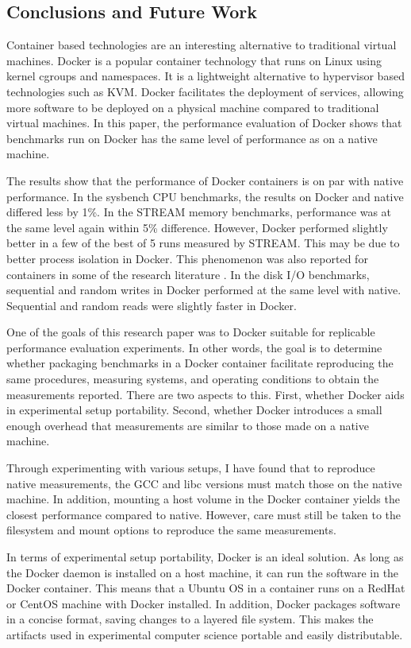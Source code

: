 \documentclass[11pt]{article}
\begin{document}
\begin{itemize}
\section{Conclusions and Future Work}

Container based technologies are an interesting alternative to traditional virtual machines. Docker is a popular container technology that runs on Linux using kernel cgroups and namespaces. It is a lightweight alternative to hypervisor based technologies such as KVM. Docker facilitates the deployment of services, allowing more software to be deployed on a physical machine compared to traditional virtual machines. In this paper, the performance evaluation of Docker shows that benchmarks run on Docker has the same level of performance as on a native machine. 

The results show that the performance of Docker containers is on par with native performance. In the sysbench CPU benchmarks, the results on Docker and native differed less by 1\%. In the STREAM memory benchmarks, performance was at the same level again within 5\% difference. However, Docker performed slightly better in a few of the best of 5 runs measured by STREAM. This may be due to better process isolation in Docker. This phenomenon was also reported for containers in some of the research literature \cite{estrada}. In the disk I/O benchmarks, sequential and random writes in Docker performed at the same level with native. Sequential and random reads were slightly faster in Docker. 

One of the goals of this research paper was to Docker suitable for replicable performance evaluation experiments. In other words, the goal is to determine whether packaging benchmarks in a Docker container facilitate reproducing the same procedures, measuring systems, and operating conditions to obtain the measurements reported. There are two aspects to this. First, whether Docker aids in experimental setup portability. Second, whether Docker introduces a small enough overhead that measurements are similar to those made on a native machine. 

Through experimenting with various setups, I have found that to reproduce native measurements, the GCC and libc versions must match those on the native machine. In addition, mounting a host volume in the Docker container yields the closest performance compared to native. However, care must still be taken to the filesystem and mount options to reproduce the same measurements. 

In terms of experimental setup portability, Docker is an ideal solution. As long as the Docker daemon is installed on a host machine, it can run the software in the Docker container. This means that a Ubuntu OS in a container runs on a RedHat or CentOS machine with Docker installed. In addition, Docker packages software in a concise format, saving changes to a layered file system. This makes the artifacts used in experimental computer science portable and easily distributable. 


\end{itemize}
\end{document}
